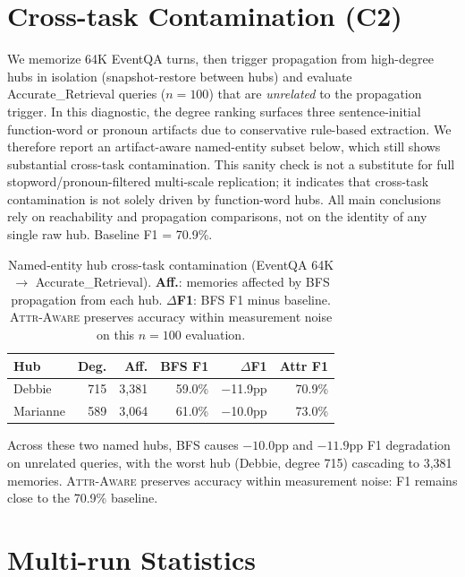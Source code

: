 \documentclass{article}
\newcommand{\attraware}{\textsc{Attr-Aware}}
\begin{document}
\appendix

\section{Cross-task Contamination (C2)}
\label{app:cross_task}

We memorize 64K EventQA turns, then trigger propagation from high-degree hubs in isolation (snapshot-restore between hubs) and evaluate Accurate\_Retrieval queries ($n{=}100$) that are \textit{unrelated} to the propagation trigger.
In this diagnostic, the degree ranking surfaces three sentence-initial function-word or pronoun artifacts due to conservative rule-based extraction.
We therefore report an artifact-aware named-entity subset below, which still shows substantial cross-task contamination.
This sanity check is not a substitute for full stopword/pronoun-filtered multi-scale replication; it indicates that cross-task contamination is not solely driven by function-word hubs.
All main conclusions rely on reachability and propagation comparisons, not on the identity of any single raw hub.
Baseline F1 = 70.9\%.

\begin{table}[htbp]
\centering
\footnotesize
\begin{tabular}{lrrrrr}
\toprule
\textbf{Hub} & \textbf{Deg.} & \textbf{Aff.} & \textbf{BFS F1} & \textbf{$\Delta$F1} & \textbf{Attr F1} \\
\midrule
Debbie   & 715 & 3{,}381 & 59.0\% & $-$11.9pp & 70.9\% \\
Marianne & 589 & 3{,}064 & 61.0\% & $-$10.0pp & 73.0\% \\
\bottomrule
\end{tabular}
\caption{Named-entity hub cross-task contamination (EventQA 64K $\rightarrow$ Accurate\_Retrieval).
\textbf{Aff.}: memories affected by BFS propagation from each hub.
\textbf{$\Delta$F1}: BFS F1 minus baseline.
\attraware{} preserves accuracy within measurement noise on this $n{=}100$ evaluation.}
\label{tab:cross_task}
\end{table}

Across these two named hubs, BFS causes $-10.0$pp and $-11.9$pp F1 degradation on unrelated queries, with the worst hub (Debbie, degree 715) cascading to 3,381 memories.
\attraware{} preserves accuracy within measurement noise: F1 remains close to the 70.9\% baseline.

\section{Multi-run Statistics}
\label{app:stats}
\end{document}
